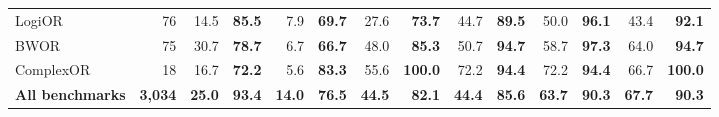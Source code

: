\begin{table}[htbp]
\begin{tabular*}{\textwidth}{@{\extracolsep{\fill}}lrrrrrrrrrrrrr@{}}
LogiOR & 76 & 14.5 & \textbf{85.5} & 7.9 & \textbf{69.7} & 27.6 & \textbf{73.7} & 44.7 & \textbf{89.5} & 50.0 & \textbf{96.1} & 43.4 & \textbf{92.1} \\
BWOR & 75 & 30.7 & \textbf{78.7} & 6.7 & \textbf{66.7} & 48.0 & \textbf{85.3} & 50.7 & \textbf{94.7} & 58.7 & \textbf{97.3} & 64.0 & \textbf{94.7} \\
ComplexOR & 18 & 16.7 & \textbf{72.2} & 5.6 & \textbf{83.3} & 55.6 & \textbf{100.0} & 72.2 & \textbf{94.4} & 72.2 & \textbf{94.4} & 66.7 & \textbf{100.0} \\
\midrule
\textbf{All benchmarks} & \textbf{3,034} & \textbf{25.0} & \textbf{93.4} & \textbf{14.0} & \textbf{76.5} & \textbf{44.5} & \textbf{82.1} & \textbf{44.4} & \textbf{85.6} & \textbf{63.7} & \textbf{90.3} & \textbf{67.7} & \textbf{90.3} \\
\bottomrule
\end{tabular*}
\end{table}
